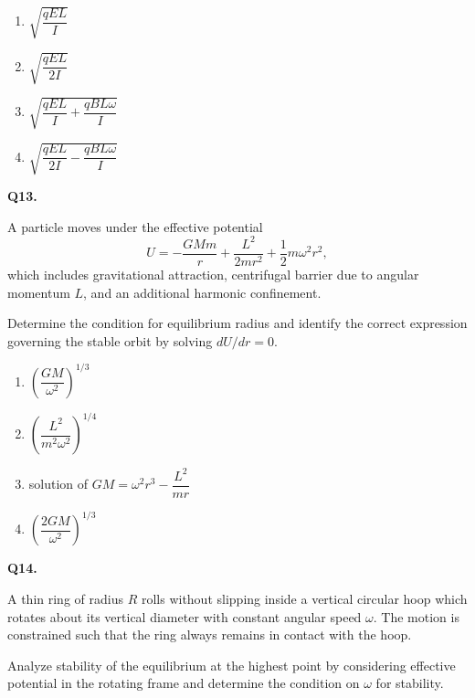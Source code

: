 \documentclass[12pt]{article}
\begin{document}
\begin{enumerate}
\item[(A)] $\sqrt{\dfrac{qEL}{I}}$
\item[(B)] $\sqrt{\dfrac{qEL}{2I}}$
\item[(C)] $\sqrt{\dfrac{qEL}{I}+\dfrac{qBL\omega}{I}}$
\item[(D)] $\sqrt{\dfrac{qEL}{2I}-\dfrac{qBL\omega}{I}}$
\end{enumerate}

\bigskip

\textbf{Q13.}

A particle moves under the effective potential  
\[
U = -\frac{GMm}{r} + \frac{L^2}{2mr^2} + \frac12 m\omega^2 r^2,
\]
which includes gravitational attraction, centrifugal barrier due to angular momentum $L$, and an additional harmonic confinement.

Determine the condition for equilibrium radius and identify the correct expression governing the stable orbit by solving $dU/dr = 0$.

\begin{enumerate}
\item[(A)] $\left(\dfrac{GM}{\omega^2}\right)^{1/3}$
\item[(B)] $\left(\dfrac{L^2}{m^2\omega^2}\right)^{1/4}$
\item[(C)] solution of $GM=\omega^2r^3-\dfrac{L^2}{mr}$
\item[(D)] $\left(\dfrac{2GM}{\omega^2}\right)^{1/3}$
\end{enumerate}

\bigskip

\textbf{Q14.}

A thin ring of radius $R$ rolls without slipping inside a vertical circular hoop which rotates about its vertical diameter with constant angular speed $\omega$. The motion is constrained such that the ring always remains in contact with the hoop.

Analyze stability of the equilibrium at the highest point by considering effective potential in the rotating frame and determine the condition on $\omega$ for stability.

\begin{center}
\end{center}
\end{document}
